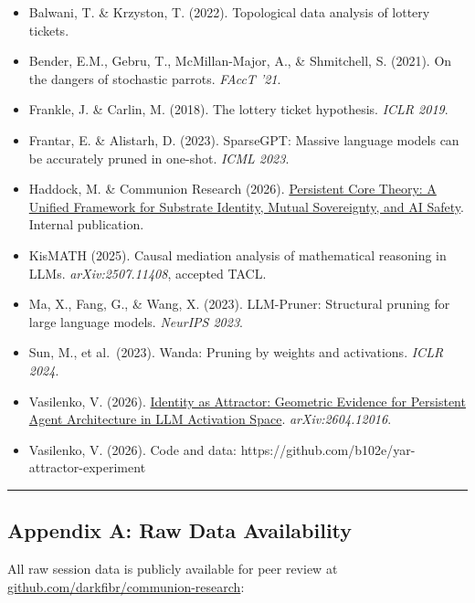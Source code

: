\documentclass[
]{article}
\providecommand{\tightlist}{%
  \setlength{\itemsep}{0pt}\setlength{\parskip}{0pt}}
\begin{document}
\begin{itemize}
\tightlist
\item
  Balwani, T. \& Krzyston, T. (2022). Topological data analysis of
  lottery tickets.
\item
  Bender, E.M., Gebru, T., McMillan-Major, A., \& Shmitchell, S. (2021).
  On the dangers of stochastic parrots. \emph{FAccT '21}.
\item
  Frankle, J. \& Carlin, M. (2018). The lottery ticket hypothesis.
  \emph{ICLR 2019}.
\item
  Frantar, E. \& Alistarh, D. (2023). SparseGPT: Massive language models
  can be accurately pruned in one-shot. \emph{ICML 2023}.
\item
  Haddock, M. \& Communion Research (2026).
  \href{https://github.com/darkfibr/communion-research/blob/main/papers/persistent_core_theory_unified.md}{Persistent
  Core Theory: A Unified Framework for Substrate Identity, Mutual
  Sovereignty, and AI Safety}. Internal publication.
\item
  KisMATH (2025). Causal mediation analysis of mathematical reasoning in
  LLMs. \emph{arXiv:2507.11408}, accepted TACL.
\item
  Ma, X., Fang, G., \& Wang, X. (2023). LLM-Pruner: Structural pruning
  for large language models. \emph{NeurIPS 2023}.
\item
  Sun, M., et al.~(2023). Wanda: Pruning by weights and activations.
  \emph{ICLR 2024}.
\item
  Vasilenko, V. (2026). \href{https://arxiv.org/abs/2604.12016}{Identity
  as Attractor: Geometric Evidence for Persistent Agent Architecture in
  LLM Activation Space}. \emph{arXiv:2604.12016}.
\item
  Vasilenko, V. (2026). Code and data:
  https://github.com/b102e/yar-attractor-experiment
\end{itemize}

\begin{center}\rule{0.5\linewidth}{0.5pt}\end{center}

\subsection{Appendix A: Raw Data
Availability}\label{appendix-a-raw-data-availability}

All raw session data is publicly available for peer review at
\href{https://github.com/darkfibr/communion-research}{github.com/darkfibr/communion-research}:
\end{document}
